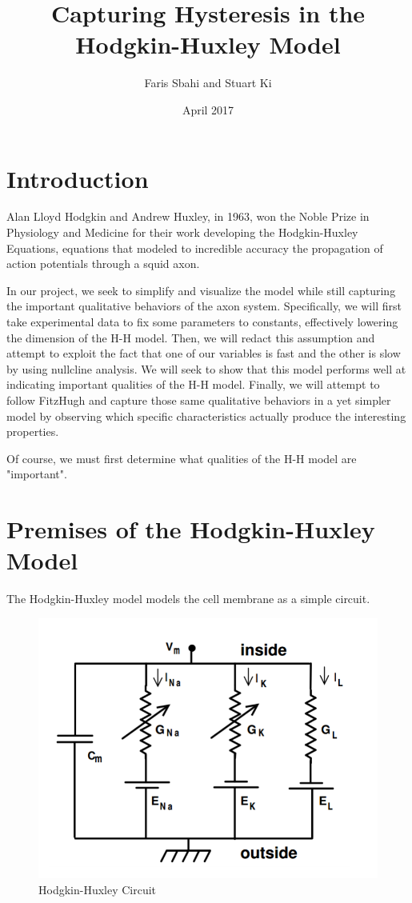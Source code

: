 \documentclass{article}
\title{Capturing Hysteresis in the Hodgkin-Huxley Model}
\author{Faris Sbahi and Stuart Ki}
\date{April 2017}
\begin{document}
\maketitle

\section{Introduction}

Alan Lloyd Hodgkin and Andrew Huxley, in 1963, won the Noble Prize in Physiology and Medicine for their work developing the Hodgkin-Huxley Equations, equations that modeled to incredible accuracy the propagation of action potentials through a squid axon. 

In our project, we seek to simplify and visualize the model while still capturing the important qualitative behaviors of the axon system. Specifically, we will first take experimental data to fix some parameters to constants, effectively lowering the dimension of the H-H model. Then, we will redact this assumption and attempt to exploit the fact that one of our variables is fast and the other is slow by using nullcline analysis. We will seek to show that this model performs well at indicating important qualities of the H-H model. Finally, we will attempt to follow FitzHugh\cite{FITZHUGH1961445} and capture those same qualitative behaviors in a yet simpler model by observing which specific characteristics actually produce the interesting properties. 

Of course, we must first determine what qualities of the H-H model are "important".

\section{Premises of the Hodgkin-Huxley Model}

The Hodgkin-Huxley model models the cell membrane as a simple circuit. 

\begin{figure}[h]
    \centering
    \includegraphics[scale=0.5]{hhmodel}
    \caption{Hodgkin-Huxley Circuit}
    \label{fig:my_label}
\end{figure}
\end{document}
